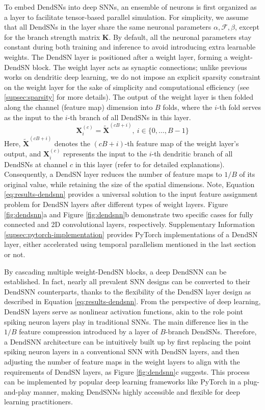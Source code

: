 To embed DendSNs into deep SNNs, an ensemble of neurons is first organized as a layer to facilitate tensor-based parallel simulation. For simplicity, we assume that all DendSNs in the layer share the same neuronal parameters $\alpha, \mathcal{F}, \beta$, except for the branch strength matrix $\mathbf{K}$. By default, all the neuronal parameters stay constant during both training and inference to avoid introducing extra learnable weights. The DendSN layer is positioned after a weight layer, forming a weight-DendSN block. The weight layer acts as synaptic connections; unlike previous works on dendritic deep learning, we do not impose an explicit sparsity constraint on the weight layer \cite{wu2018improved,zheng2024temporal} for the sake of simplicity and computational efficiency (see \ref{supsec:sparsity} for more details). The output of the weight layer is then folded along the channel (feature map) dimension into $B$ folds, where the $i$-th fold serves as the input to the $i$-th branch of all DendSNs in this layer.
\begin{equation}\label{eq:results-dendsnn}
\mathbf{X}_{i}^{(c)} = \mathbf{\tilde{X}}^{(cB+i)}, \ i \in \{0, \dots, B-1\}
\end{equation} Here, $\mathbf{\tilde{X}}^{(cB+i)}$ denotes the $(cB+i)$-th feature map of the weight layer's output, and $\mathbf{X}^{(c)}_i$ represents the input to the $i$-th dendritic branch of all DendSNs at channel $c$ in this layer (refer to  for detailed explanations). Consequently, a DendSN layer reduces the number of feature maps to $1/B$ of its original value, while retaining the size of the spatial dimensions. Note, Equation \eqref{eq:results-dendsnn} provides a universal solution to the input feature assignment problem for DendSN layers after different types of weight layers. Figure \ref{fig:dendsnn}a and Figure \ref{fig:dendsnn}b demonstrate two specific cases for fully connected and 2D convolutional layers, respectively. Supplementary Information \ref{supsec:pytorch-implementation} provides PyTorch implementations of a DendSN layer, either accelerated using temporal parallelism mentioned in the last section or not.

By cascading multiple weight-DendSN blocks, a deep DendSNN can be established. In fact, nearly all prevalent SNN designs can be converted to their DendSNN counterparts, thanks to the flexibility of the DendSN layer design as described in Equation \eqref{eq:results-dendsnn}. From the perspective of deep learning, DendSN layers serve as nonlinear activation functions, akin to the role point spiking neuron layers play in traditional SNNs. The main difference lies in the $1/B$ feature compression introduced by a layer of $B$-branch DendSNs. Therefore, a DendSNN architecture can be intuitively built up by first replacing the point spiking neuron layers in a conventional SNN with DendSN layers, and then adjusting the number of feature maps in the weight layers to align with the requirements of DendSN layers, as Figure \ref{fig:dendsnn}c suggests. This process can be implemented by popular deep learning frameworks like PyTorch \cite{paszke2019pytorch} in a plug-and-play manner, making DendSNNs highly accessible and flexible for deep learning practitioners.

